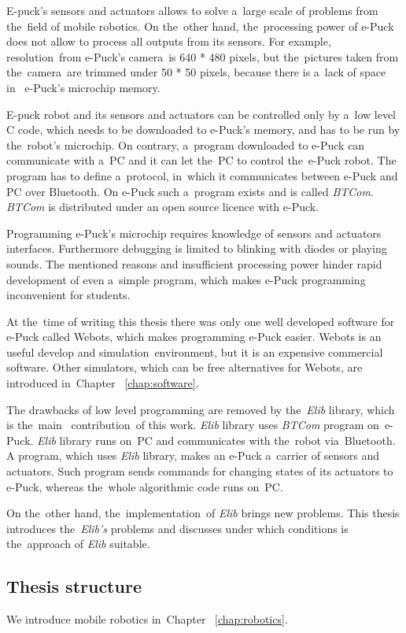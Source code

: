  E-puck's sensors and actuators allows to solve a~large scale of problems from the~field of mobile robotics. 
  On the~other hand, the~processing power of e-Puck does not allow to 
  process all outputs from its sensors. For example, resolution~from e-Puck's camera~is 640 * 480 pixels,
  but the~pictures taken from the~camera~are trimmed under 50 * 50 pixels, because there is a~lack of space in~
   e-Puck's microchip memory.
   
   E-puck robot and its sensors and actuators can be controlled only by a~low level C code,
    which needs to be downloaded to e-Puck's memory, and has to be run by the~robot's microchip.
   On contrary, a~program downloaded to e-Puck can communicate with
   a~PC and it can let the~PC to control the~e-Puck robot. 
   The program has to define a~protocol, in~which it communicates between e-Puck and PC over Bluetooth.
  On e-Puck such a~program exists and is called {\it BTCom}. 
  {\it BTCom} is distributed under an open source licence with e-Puck.

  Programming e-Puck's microchip requires knowledge of sensors and actuators interfaces.
  Furthermore debugging is limited to blinking with diodes or playing sounds.
  The mentioned reasons and insufficient processing power hinder rapid development of even a~simple program, 
  which makes e-Puck programming inconvenient for students.
  
  At the~time of writing this thesis there was only one well developed software for e-Puck called Webots,
  which makes programming e-Puck easier.
  Webots is an useful develop and simulation~environment, but it is an expensive commercial software.
  Other simulators, which can be free alternatives for Webots, are introduced in~Chapter ~\ref{chap:software}.
  
  The drawbacks of low level programming are removed by the~{\it Elib} library, which is the~main~
  contribution~of this work.
  {\it Elib} library uses {\it BTCom} program on~e-Puck.
  {\it Elib} library runs on~PC and communicates with the~robot via~Bluetooth. 
  A program, which uses {\it Elib} library,	makes an e-Puck a~carrier of sensors and actuators. 
  Such program sends commands for changing states of its actuators to e-Puck,
  whereas the~whole algorithmic code runs on~PC.
  
  On the~other hand, the~implementation~of {\it Elib} brings new problems.
  This thesis introduces the~{\it Elib's} problems and discusses 
  under which conditions is the~approach of {\it Elib} suitable.	
  \subsection*{Thesis structure}
  We introduce mobile robotics in~Chapter ~\ref{chap:robotics}.

